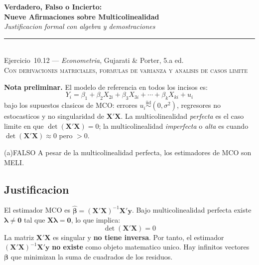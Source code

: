 \documentclass[12pt, letterpaper]{article}
\theoremstyle{remark}
\begin{document}
\begin{center}
  {\LARGE\bfseries Verdadero, Falso o Incierto:}\\[6pt]
  {\LARGE\bfseries Nueve Afirmaciones sobre Multicolinealidad}\\[12pt]
  {\large\itshape Justificacion formal con algebra y demostraciones}\\[14pt]
  \rule{0.55\linewidth}{0.6pt}\\[8pt]
  {\normalsize Ejercicio~10.12 --- \textit{Econometria}, Gujarati \& Porter, 5.a ed.}\\[4pt]
  {\small\textsc{Con derivaciones matriciales, formulas de varianza y analisis de casos limite}}
\end{center}

\vspace{10pt}

\noindent\textbf{Nota preliminar.}\quad
El modelo de referencia en todos los incisos es:
\begin{equation}
  Y_i = \beta_1 + \beta_2 X_{2i} + \beta_3 X_{3i} + \cdots + \beta_k X_{ki} + u_i
  \label{eq:modelo}
\end{equation}
bajo los supuestos clasicos de MCO: errores $u_i \overset{\text{iid}}{\sim}(0, \sigma^2)$,
regresores no estocasticos y no singularidad de $\mathbf{X'X}$.
La multicolinealidad \emph{perfecta} es el caso limite en que
$\det(\mathbf{X'X}) = 0$; la multicolinealidad \emph{imperfecta} o
\emph{alta} es cuando $\det(\mathbf{X'X}) \approx 0$ pero $> 0$.

\bigskip

\begin{verdict}{(a)}{FALSO}
  A pesar de la multicolinealidad perfecta, los estimadores de MCO son MELI.
\end{verdict}

\subsection*{Justificacion}

El estimador MCO es $\hat{\boldsymbol\beta} = (\mathbf{X'X})^{-1}\mathbf{X'y}$.
Bajo multicolinealidad perfecta existe $\boldsymbol\lambda \neq \mathbf{0}$ tal que
$\mathbf{X}\boldsymbol\lambda = \mathbf{0}$, lo que implica:
\begin{equation}
  \det(\mathbf{X'X}) = 0
  \label{eq:det_cero}
\end{equation}
La matriz $\mathbf{X'X}$ es singular y \textbf{no tiene inversa}. Por tanto,
el estimador $(\mathbf{X'X})^{-1}\mathbf{X'y}$ \textbf{no existe} como objeto
matematico unico. Hay infinitos vectores $\boldsymbol\beta$ que minimizan la
suma de cuadrados de los residuos.
\end{document}
